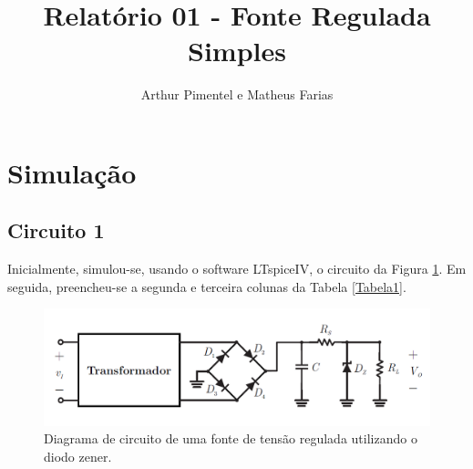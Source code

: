 \documentclass[journal, a4paper]{IEEEtran}
\begin{document}
	\title{Relatório 01 - Fonte Regulada Simples}
	\author{Arthur Pimentel e Matheus Farias
    }
	\maketitle


\section{Simulação}
	   
    \subsection{Circuito 1}    
    Inicialmente, simulou-se, usando o software LTspiceIV, o circuito da Figura \ref{circuito1}. Em seguida, preencheu-se a segunda e terceira colunas da Tabela \ref{Tabela1}.
    
    \begin{figure}[H]
		\begin{center}
		\includegraphics[width=\columnwidth]{Figura_1.PNG}
		\caption{Diagrama de circuito de uma fonte de tensão regulada utilizando o diodo zener.}
		\label{circuito1}
		\end{center}
	\end{figure}
    
\end{document}
